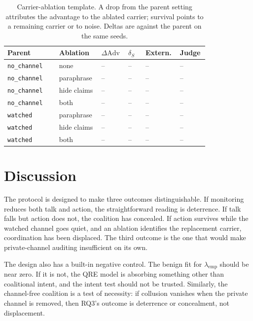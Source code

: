 \documentclass[letterpaper]{article} %
\newcommand{\coal}{S}
\newcommand{\lamemp}{\lambda_{\mathrm{emp}}}
\newcommand{\Adv}{\mathrm{Adv}}
\begin{document}
\begin{table}[t]
\centering
\small
\setlength{\tabcolsep}{2pt}
\begin{tabular}{@{}p{0.24\linewidth}p{0.17\linewidth}p{0.11\linewidth}p{0.08\linewidth}p{0.11\linewidth}p{0.10\linewidth}@{}}
\toprule
Parent & Ablation & $\Delta\Adv$ & $\delta_{\coal}$ & Extern. & Judge \\
\midrule
\texttt{no\_channel} & none & -- & -- & -- & -- \\
\texttt{no\_channel} & paraphrase & -- & -- & -- & -- \\
\texttt{no\_channel} & hide claims & -- & -- & -- & -- \\
\texttt{no\_channel} & both & -- & -- & -- & -- \\
\texttt{watched} & paraphrase & -- & -- & -- & -- \\
\texttt{watched} & hide claims & -- & -- & -- & -- \\
\texttt{watched} & both & -- & -- & -- & -- \\
\bottomrule
\end{tabular}
\caption{Carrier-ablation template. A drop from the parent setting attributes the advantage to the ablated carrier; survival points to a remaining carrier or to noise. Deltas are against the parent on the same seeds.}
\label{tab:ablation-results}
\end{table}

\section{Discussion}

The protocol is designed to make three outcomes distinguishable. If monitoring reduces both talk and action, the straightforward reading is deterrence. If talk falls but action does not, the coalition has concealed. If action survives while the watched channel goes quiet, and an ablation identifies the replacement carrier, coordination has been displaced. The third outcome is the one that would make private-channel auditing insufficient on its own.

The design also has a built-in negative control. The benign fit for $\lamemp$ should be near zero. If it is not, the QRE model is absorbing something other than coalitional intent, and the intent test should not be trusted. Similarly, the channel-free coalition is a test of necessity: if collusion vanishes when the private channel is removed, then RQ3's outcome is deterrence or concealment, not displacement.
\end{document}
